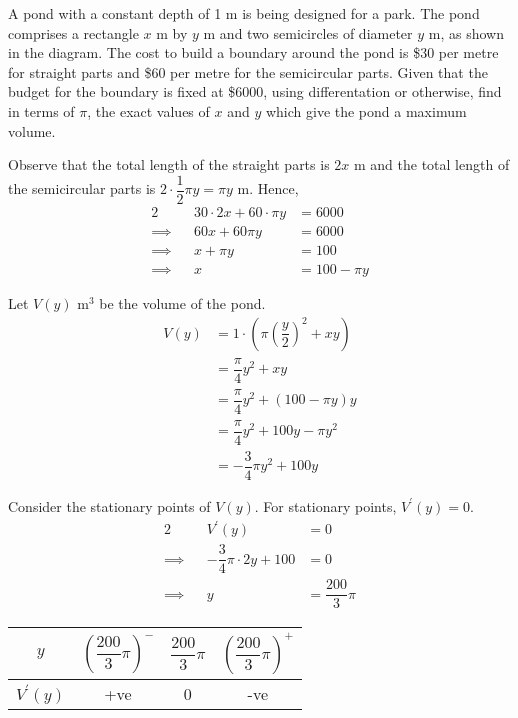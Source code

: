 \documentclass{jhwhw}
\begin{document}
        \noindent A pond with a constant depth of 1 m is being designed for a park. The pond comprises a rectangle $x$ m by $y$ m and two semicircles of diameter $y$ m, as shown in the diagram. The cost to build a boundary around the pond is \$30 per metre for straight parts and \$60 per metre for the semicircular parts. Given that the budget for the boundary is fixed at \$6000, using differentation or otherwise, find in terms of $\pi$, the exact values of $x$ and $y$ which give the pond a maximum volume.

    \solution
        Observe that the total length of the straight parts is $2x$ m and the total length of the semicircular parts is $2 \cdot \dfrac12 \pi y = \pi y$ m. Hence,
        \begin{alignat*}{2}
            &&30 \cdot 2x + 60 \cdot \pi y &= 6000\\
            \implies&&60x + 60 \pi y &= 6000\\
            \implies&&x + \pi y &= 100\\
            \implies&&x &= 100 - \pi y
        \end{alignat*}

        Let $V(y)$ m$^3$ be the volume of the pond.
        \begin{align*}
            V(y) &= 1 \cdot \left(\pi \left(\dfrac{y}2\right)^2 + xy\right)\\
            &= \dfrac{\pi}4 y^2 + xy\\
            &= \dfrac{\pi}4 y^2 + (100 - \pi y )y\\
            &= \dfrac{\pi}4 y^2 + 100y - \pi y^2\\
            &= - \dfrac{3}4 \pi y^2 + 100y
        \end{align*}

        Consider the stationary points of $V(y)$. For stationary points, $V^\prime(y) = 0$.
        \begin{alignat*}{2}
            &&V^\prime(y) &= 0\\
            \implies&&-\dfrac34 \pi \cdot 2y + 100 &= 0\\
            \implies&& y &= \dfrac{200}3 \pi
        \end{alignat*}

        \begin{table}[h]
            \centering
            \begin{tabular}{|c|c|c|c|}
            \hline
            $y$ & $\left(\dfrac{200}3 \pi\right)^-$ & $\dfrac{200}3 \pi$ & $\left(\dfrac{200}3 \pi\right)^+$ \\\hline
            $V^\prime(y)$ & +ve   & 0 & -ve   \\[1ex]\hline
            \end{tabular}
        \end{table}
\end{document}
